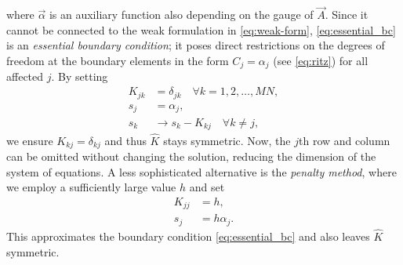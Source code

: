 where $\vec{\alpha}$ is an auxiliary function also depending on the gauge of $\vec{A}$. Since it cannot be connected to the weak formulation in \cref{eq:weak-form}, \cref{eq:essential_bc} is an \emph{essential boundary condition}; it poses direct restrictions on the degrees of freedom at the boundary elements in the form $C_{j} = \alpha_{j}$ (see \cref{eq:ritz}) for all affected $j$. By setting
\begin{align}
  K_{jk} &= \delta_{jk} \quad \forall k = 1, 2, \dotsc, M N, \\
  s_{j} &= \alpha_{j}, \\
  s_{k} &\to s_{k} - K_{kj} \quad \forall k \neq j,
\end{align}
we ensure $K_{kj} = \delta_{kj}$ and thus $\hat{K}$ stays symmetric. Now, the $j$th row and column can be omitted without changing the solution, reducing the dimension of the system of equations. A less sophisticated alternative is the \emph{penalty method}, where we employ a sufficiently large value $h$ and set
\begin{align}
  K_{jj} &= h, \\
  s_{j} &= h \alpha_{j}.
\end{align}
This approximates the boundary condition \cref{eq:essential_bc} and also leaves $\hat{K}$ symmetric.

